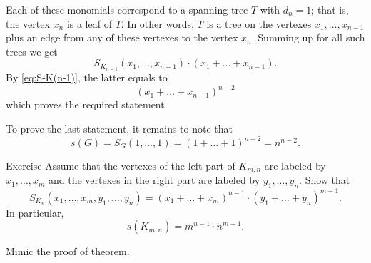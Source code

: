 Each of these monomials correspond to a spanning tree $T$ with $d_n=1$;
that is, the vertex $x_n$ is a leaf of $T$.
In other words, $T$ is a tree on the vertexes $x_1,\dots,x_{n-1}$ plus an edge from any of these vertexes to the vertex $x_n$. 
Summing up for all such trees we get 
\[S_{K_{n-1}}(x_1,\dots,x_{n-1})\cdot(x_1+\dots+x_{n-1}).\]
By \ref{eq:S-K(n-1)}, the latter equals to
\[(x_1+\dots+x_{n-1})^{n-2}\]
which proves the required statement.

To prove the last statement, it remains to note that 
\[s(G)=S_G(1,\dots,1)=(1+\dots+1)^{n-2}=n^{n-2}.\]
\qedsf

\begin{thm}{Exercise}
Assume that the vertexes of the left part of $K_{m,n}$ are labeled by $x_1,\dots,x_m$ and the vertexes in the right part are labeled by $y_1,\dots,y_n$. 
Show that
\[S_{K_n}(x_1,\dots,x_m,y_1,\dots,y_n)=(x_1+\dots +x_m)^{n-1}\cdot(y_1+\dots +y_n)^{m-1}.\]
In particular, 
\[s(K_{m,n})=m^{n-1}\cdot n^{m-1}.\]

\end{thm}

 Mimic the proof of theorem.